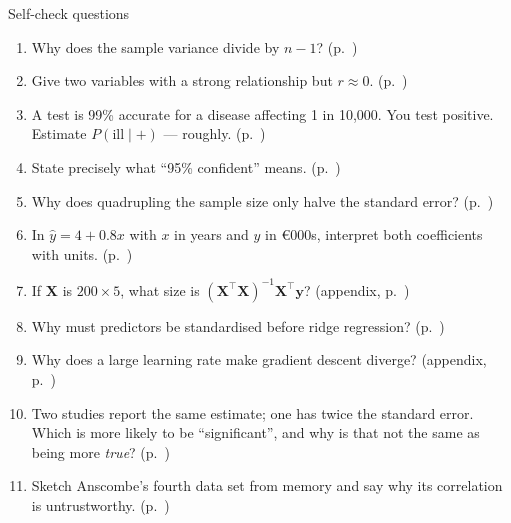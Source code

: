 \documentclass[aspectratio=169,11pt]{beamer}
\begin{document}
\begin{frame}{Self-check questions}
  \begin{enumerate}
    \item Why does the sample variance divide by $n-1$? (p.~\pageref{frm:spread})
    \item Give two variables with a strong relationship but $r \approx 0$. (p.~\pageref{frm:rsees})
    \item A test is 99\% accurate for a disease affecting 1 in 10{,}000.
          You test positive. Estimate $P(\text{ill}\mid+)$ --- roughly. (p.~\pageref{frm:screening})
    \item State precisely what ``95\% confident'' means. (p.~\pageref{frm:cimeaning})
    \item Why does quadrupling the sample size only halve the standard
          error? (p.~\pageref{frm:sqrtlaw})
    \item In $\hat y = 4 + 0.8x$ with $x$ in years and $y$ in \euro 000s,
          interpret both coefficients with units. (p.~\pageref{frm:regtable})
    \item If $\mathbf{X}$ is $200 \times 5$, what size is
          $(\mathbf{X}^\top\mathbf{X})^{-1}\mathbf{X}^\top\mathbf{y}$?
          (appendix, p.~\pageref{frm:matrix})
    \item Why must predictors be standardised before ridge regression? (p.~\pageref{frm:zscore})
    \item Why does a large learning rate make gradient descent diverge?
          (appendix, p.~\pageref{frm:gddrawn})
    \item Two studies report the same estimate; one has twice the standard
          error. Which is more likely to be ``significant'', and why is that
          not the same as being more \emph{true}? (p.~\pageref{frm:pnot})
    \item Sketch Anscombe's fourth data set from memory and say why its
          correlation is untrustworthy. (p.~\pageref{frm:anscombe})
  \end{enumerate}
\end{frame}
\end{document}
